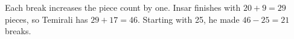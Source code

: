 Each break increases the piece count by one. Insar finishes with $20+9=29$ pieces, so Temirali has $29+17=46$. Starting with 25, he made $46-25=\boxed{21}$ breaks.
